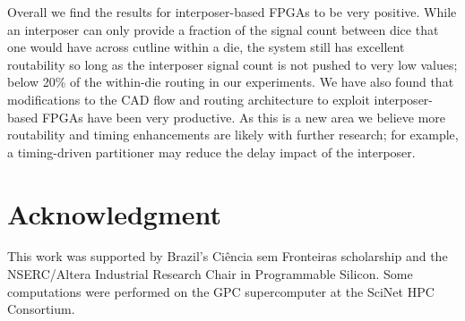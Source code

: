 \documentclass[journal]{IEEEtran}
\begin{document}
Overall we find the results for interposer-based FPGAs to be very positive. While an interposer can only provide a fraction of the signal count between dice that one would have across cutline within a die, the system still has excellent routability so long as the interposer signal count is not pushed to very low values; below 20\% of the within-die routing in our experiments. We have also found that modifications to the CAD flow and routing architecture to exploit interposer-based FPGAs have been very productive. As this is a new area we believe more routability and timing enhancements are likely with further research; for example, a timing-driven partitioner may reduce the delay impact of the interposer.

\section*{Acknowledgment}
This work was supported by Brazil's Ci\^{e}ncia sem Fronteiras scholarship and the NSERC/Altera Industrial Research Chair in Programmable Silicon. Some computations were performed on the GPC supercomputer at the SciNet HPC Consortium.




\end{document}
